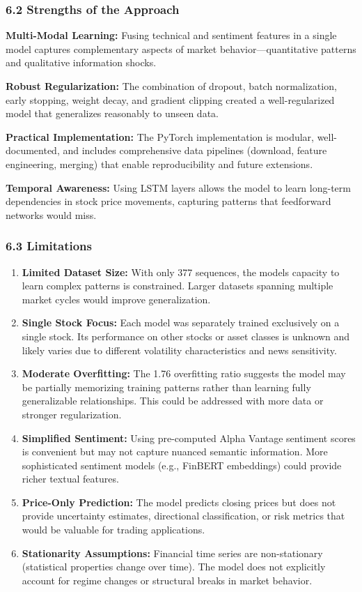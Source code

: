 \documentclass[
]{article}
\begin{document}
\subsubsection{6.2 Strengths of the
Approach}\label{62-strengths-of-the-approach}

\textbf{Multi-Modal Learning:} Fusing technical and sentiment features
in a single model captures complementary aspects of market
behavior---quantitative patterns and qualitative information shocks.

\textbf{Robust Regularization:} The combination of dropout, batch
normalization, early stopping, weight decay, and gradient clipping
created a well-regularized model that generalizes reasonably to unseen
data.

\textbf{Practical Implementation:} The PyTorch implementation is
modular, well-documented, and includes comprehensive data pipelines
(download, feature engineering, merging) that enable reproducibility and
future extensions.

\textbf{Temporal Awareness:} Using LSTM layers allows the model to learn
long-term dependencies in stock price movements, capturing patterns that
feedforward networks would miss.

\subsubsection{6.3 Limitations}\label{63-limitations}

\begin{enumerate}
\def\labelenumi{\arabic{enumi}.}
\item
  \textbf{Limited Dataset Size:} With only 377 sequences, the
  model\textquotesingle s capacity to learn complex patterns is
  constrained. Larger datasets spanning multiple market cycles would
  improve generalization.
\item
  \textbf{Single Stock Focus:} Each model was separately trained
  exclusively on a single stock. Its performance on other stocks or
  asset classes is unknown and likely varies due to different volatility
  characteristics and news sensitivity.
\item
  \textbf{Moderate Overfitting:} The 1.76 overfitting ratio suggests the
  model may be partially memorizing training patterns rather than
  learning fully generalizable relationships. This could be addressed
  with more data or stronger regularization.
\item
  \textbf{Simplified Sentiment:} Using pre-computed Alpha Vantage
  sentiment scores is convenient but may not capture nuanced semantic
  information. More sophisticated sentiment models (e.g., FinBERT
  embeddings) could provide richer textual features.
\item
  \textbf{Price-Only Prediction:} The model predicts closing prices but
  does not provide uncertainty estimates, directional classification, or
  risk metrics that would be valuable for trading applications.
\item
  \textbf{Stationarity Assumptions:} Financial time series are
  non-stationary (statistical properties change over time). The model
  does not explicitly account for regime changes or structural breaks in
  market behavior.
\end{enumerate}
\end{document}
